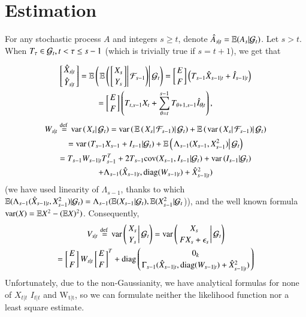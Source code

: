 \documentclass[english]{elsarticle}
\theoremstyle{plain}
\theoremstyle{remark}
\theoremstyle{plain}
\theoremstyle{definition}
\begin{document}
\section{Estimation}

\label{sec:Estimation}For any stochastic process $A$ and integers
$s\geq t$, denote $\hat{A}_{s|t}=\mathbb{E}(A_{s}|\mathcal{G}_{t})$. Let $s>t$.
When $T_{\tau}\in\mathcal{G}_{t},t<\tau\leq s-1$ (which is trivially true
if $s=t+1$), we get that

\begin{multline*}
\left[{\hat{X}_{s|t}\atop \hat{Y}_{s|t}}\right]=\mathbb{E}\left(\left.\mathbb{E}\left(\left.\left[{X_{s}\atop Y_{s}}\right]\right|\mathcal{F}_{s-1}\right)\right|\mathcal{G}_{t}\right)=\left[{E\atop F}\right]\left(T_{s-1}\hat{X}_{s-1|t}+\hat{I}_{s-1|t}\right)\\
=\left[{E\atop F}\right]\left(T_{t,s-1}X_{t}+\sum_{\theta=t}^{s-1}T_{\theta+1,s-1}\hat{I}_{\theta|t}\right),
\end{multline*}
\begin{multline*}
W_{s|t}\stackrel{\text{def }}{=}\mathrm{var}\left(\left.X_{s}\right|\mathcal{G}_{t}\right)=\mathrm{var}\left(\left.\mathbb{E}\left(\left.X_{s}\right|\mathcal{F}_{s-1}\right)\right|\mathcal{G}_{t}\right)+\mathbb{E}\left(\left.\mathrm{var}\left(\left.X_{s}\right|\mathcal{F}_{s-1}\right)\right|\mathcal{G}_{t}\right)\\
=\mathrm{var}\left(T_{s-1}X_{s-1}+I_{s-1}|\mathcal{G}_{t}\right)+\mathbb{E}\left(\left.\Lambda_{s-1}(X_{s-1},X_{s-1}^{2})\right|\mathcal{G}_{t}\right)\\
=T_{s-1}W_{s-1|t}T_{s-1}^{T}+2T_{s-1}\mathrm{cov}(X_{s-1},I_{s-1}|\mathcal{G}_{t})+\mathrm{var}\left(I_{s-1}|\mathcal{G}_{t}\right)\\
+\Lambda_{s-1}(\hat{X}_{s-1|t},\mathrm{diag}(W_{s-1|t})+\hat{X}_{s-1|t}^{2})
\end{multline*}
(we have used linearity of $\Lambda_{s-1}$, thanks to which $\mathbb{E}(\Lambda_{s-1}(\hat{X}_{s-1|t},X_{s-1}^{2})|\mathcal{G}_{t})=\Lambda_{s-1}(\mathbb{E}(X_{s-1}|\mathcal{G}_{t}),\mathbb{E}(X_{s-1}^{2}|\mathcal{G}_{t}$)),
and the well known formula $\mathrm{var}(X)=\mathbb{E} X^{2}-(\mathbb{E} X)^{2})$. Consequently,
\begin{multline*}
V_{s|t}\stackrel{\text{def }}{=}\mathrm{var}\left(\left.{X_{s}\atop Y_{s}}\right|\mathcal{G}_{t}\right)=\mathrm{var}\left(\left.{X_{s}\atop FX_{s}+\epsilon_{s}}\right|\mathcal{G}_{t}\right)\\
=\left[{E\atop F}\right]W_{s|t}\left[{E\atop F}\right]^{T}+\mathrm{diag}\left({0_{k}\atop \Gamma_{s-1}(\hat{X}_{s-1|t},\mathrm{diag}(W_{s-1|t})+\hat{X}_{s-1|t}^{2})}\right)
\end{multline*}
Unfortunately, due to the non-Gaussianity, we have analytical formulas
for none of $X_{t|t}$ $I_{t|t}$ and $\mathrm{W_{t|t}}$, so we can
formulate neither the likelihood function nor a least square estimate.
\end{document}
